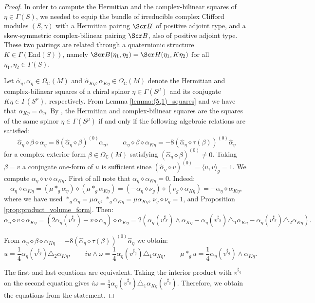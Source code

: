 \documentclass[10pt,a4paper,twoside,reqno]{amsart}
\theoremstyle{plain}
\theoremstyle{definition}
\theoremstyle{remark}
\newcommand{\End}{\mathrm{End}}
\def\C{\mathbb{C}}
\def\scB{\Scr B}
\def\scS{\Scr H}
\newcommand{\escal}[1]{\langle#1\rangle}
\begin{document}
\begin{proof}
In order to compute the Hermitian and the complex-bilinear squares of $\eta\in\Gamma(S)$, we needed to equip the bundle of irreducible complex Clifford modules $(S,\gamma)$ with a Hermitian pairing $\scS$ of positive adjoint type, and a skew-symmetric complex-bilinear pairing $\scB$, also of positive adjoint type. These two pairings are related through a quaternionic structure $K\in\Gamma(\End(S))$, namely $\scB(\eta_1,\eta_2)=\scS(\eta_1,K\eta_2)$ for all $\eta_1,\eta_2\in\Gamma(S)$.\medskip
    
Let $\widehat{\alpha}_\eta,\alpha_\eta\in\Omega_\C(M)$ and $\widehat{\alpha}_{K\eta},\alpha_{K\eta}\in\Omega_\C(M)$ denote the Hermitian and complex-bilinear squares of a chiral spinor $\eta\in\Gamma(S^\mu)$ and its conjugate $K\eta\in\Gamma(S^\mu)$, respectively. From Lemma \ref{lemma:(5,1)_squares} and \cite[Prop.\ 3.29]{Algebraic_Complex_Square_2025} we have that $\alpha_{K\eta}=\overline{\alpha}_\eta$. By \cite[Prop.\ 3.30]{Algebraic_Complex_Square_2025}, the Hermitian and complex-bilinear squares are the squares of the same spinor $\eta\in\Gamma(S^\mu)$ if and only if the following algebraic relations are satisfied: $$\widehat{\alpha}_\eta\diamond\beta\diamond\alpha_\eta=8(\widehat{\alpha}_\eta\diamond\beta)^{(0)}\alpha_\eta,\qquad\alpha_\eta\diamond\beta\diamond\alpha_{K\eta}=-8(\widehat{\alpha}_\eta\diamond\tau(\beta))^{(0)}\widehat{\alpha}_\eta$$ for a complex exterior form $\beta\in\Omega_\C(M)$ satisfying $(\widehat{\alpha}_\eta\diamond\beta)^{(0)}\neq0$. Taking $\beta=v$ a conjugate one-form of $u$ is sufficient since $(\widehat{\alpha}_\eta\diamond v)^{(0)}=\escal{u,v}_g=1$. We compute $\alpha_\eta\diamond v\diamond\alpha_{K\eta}$. First of all note that $\alpha_\eta\diamond\alpha_{K\eta}=0$. Indeed: $$\alpha_\eta\diamond\alpha_{K\eta}=(\mu*_g\alpha_\eta)\diamond(\mu*_g\alpha_{K\eta})=(-\alpha_\eta\diamond\nu_g)\diamond(\nu_g\diamond\alpha_{K\eta})=-\alpha_\eta\diamond\alpha_{K\eta},$$ where we have used $*_g\alpha_\eta=\mu\alpha_\eta$, $*_g\alpha_{K\eta}=\mu\alpha_{K\eta}$, $\nu_g\diamond\nu_g=1$, and Proposition \ref{prop:product_volume_form}. Then: $$\alpha_\eta\diamond v\diamond\alpha_{K\eta}=(2\alpha_\eta(v^{\sharp_g})-v\diamond\alpha_\eta)\diamond\alpha_{K\eta}=2(\alpha_\eta(v^{\sharp_g})\wedge\alpha_{K\eta}-\alpha_\eta(v^{\sharp_g})\triangle_1\alpha_{K\eta}-\alpha_\eta(v^{\sharp_g})\triangle_2\alpha_{K\eta}).$$

From $\alpha_\eta \diamond\beta\diamond\alpha_{K\eta} = -8(\widehat{\alpha}_\eta \diamond \tau(\beta))^{(0)} \widehat{\alpha}_\eta$ we obtain: $$u=\frac{1}{4}\alpha_\eta(v^{\sharp_g})\triangle_2\alpha_{K\eta},\qquad iu\wedge\omega=\frac{1}{4}\alpha_\eta(v^{\sharp_g})\triangle_1\alpha_{K\eta},\qquad\mu*_gu=\frac{1}{4}\alpha_\eta(v^{\sharp_g})\wedge\alpha_{K\eta}.$$

The first and last equations are equivalent. Taking the interior product with $v^{\sharp_g}$ on the second equation gives $i\omega=\frac{1}{4}\alpha_\eta(v^{\sharp_g})\triangle_1\alpha_{K\eta}(v^{\sharp_g})$. Therefore, we obtain the equations from the statement.
\end{proof}
\end{document}
